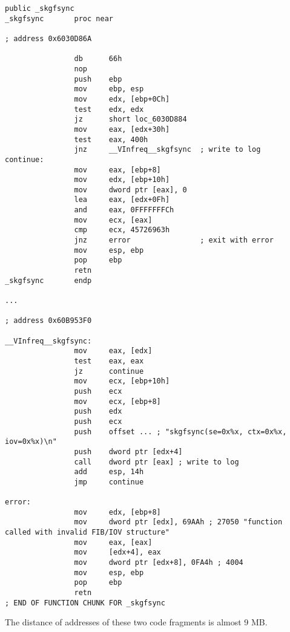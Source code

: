 \begin{lstlisting}[caption=orageneric11.dll (win32)]
                public _skgfsync
_skgfsync       proc near

; address 0x6030D86A

                db      66h
                nop
                push    ebp
                mov     ebp, esp
                mov     edx, [ebp+0Ch]
                test    edx, edx
                jz      short loc_6030D884
                mov     eax, [edx+30h]
                test    eax, 400h
                jnz     __VInfreq__skgfsync  ; write to log
continue:
                mov     eax, [ebp+8]
                mov     edx, [ebp+10h]
                mov     dword ptr [eax], 0
                lea     eax, [edx+0Fh]
                and     eax, 0FFFFFFFCh
                mov     ecx, [eax]
                cmp     ecx, 45726963h
                jnz     error                ; exit with error
                mov     esp, ebp
                pop     ebp
                retn
_skgfsync       endp

...

; address 0x60B953F0

__VInfreq__skgfsync:
                mov     eax, [edx]
                test    eax, eax
                jz      continue
                mov     ecx, [ebp+10h]
                push    ecx
                mov     ecx, [ebp+8]
                push    edx
                push    ecx
                push    offset ... ; "skgfsync(se=0x%x, ctx=0x%x, iov=0x%x)\n"
                push    dword ptr [edx+4]
                call    dword ptr [eax] ; write to log
                add     esp, 14h
                jmp     continue

error:
                mov     edx, [ebp+8]
                mov     dword ptr [edx], 69AAh ; 27050 "function called with invalid FIB/IOV structure"
                mov     eax, [eax]
                mov     [edx+4], eax
                mov     dword ptr [edx+8], 0FA4h ; 4004
                mov     esp, ebp
                pop     ebp
                retn
; END OF FUNCTION CHUNK FOR _skgfsync
\end{lstlisting}

{The distance of addresses of these two code fragments is almost 9 MB}.

